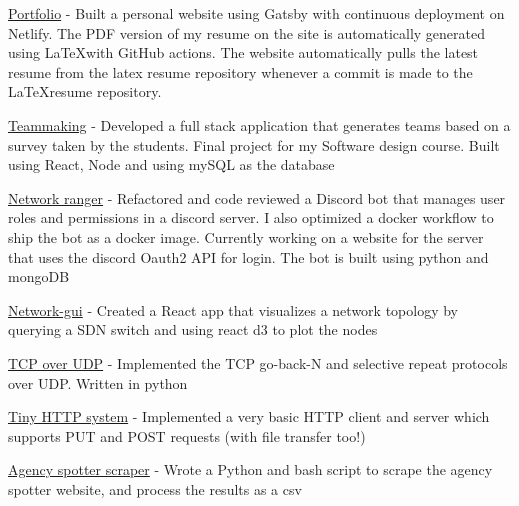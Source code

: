 
\href{https://rsun.dev}{Portfolio} - Built a personal website using Gatsby with continuous deployment on Netlify. The PDF version of my resume on the site is automatically generated using \LaTeX with GitHub actions. The website automatically pulls the latest resume from the latex resume repository whenever a commit is made to the \LaTeX resume repository.
    
\href{https://github.com/ngrover2/teammaking}{Teammaking} - Developed a full stack application that generates teams based on a survey taken by the students. Final project for my Software design course. Built using React, Node and using mySQL as the database

\href{https://github.com/networking-discord/network-ranger}{Network ranger} - Refactored and code reviewed a Discord bot that manages user roles and permissions in a discord server. I also optimized  a docker workflow to ship the bot as a docker image. Currently working on a website for the server that uses the discord Oauth2 API for login. The bot is built using python and mongoDB
    
\href{https://github.com/rahul-sundaresan/network-gui/}{Network-gui} - Created a  React app that visualizes a network topology by querying a SDN switch and using react d3 to plot the nodes

\href{https://github.com/rahul-sundaresan/ccn-6166-p2}{TCP over UDP} - Implemented the TCP go-back-N and selective repeat protocols over UDP. Written in python

\href{https://github.com/rahul-sundaresan/6166-project-1}{Tiny HTTP system} - Implemented a very basic HTTP client and server which supports PUT and POST requests (with file transfer too!)

\href{https://github.com/rahul-sundaresan/agency-spotter-scraper}{Agency spotter scraper} - Wrote a Python and bash script to scrape the agency spotter website, and process the results as a csv
